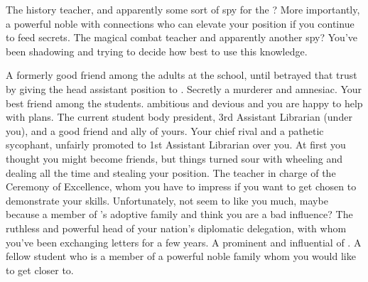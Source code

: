 \documentclass[char]{GL2020}
\begin{document}
\begin{contacts}
    \contact{\cHistory{}} The history teacher, and apparently some sort of spy for the \pFarm{}? More importantly, a powerful noble with connections who can elevate your position if you continue to feed \cHistory{\them} secrets.
    \contact{\cInterpol{}} The magical combat teacher and apparently another spy? You've been shadowing \cInterpol{} and trying to decide how best to use this knowledge. 
\end{contacts}

\begin{contacts}
    \contact{\cLibrarian{}} A formerly good friend among the adults at the school, until \cLibrarian{\they} betrayed that trust by giving the head assistant position to \cAmbition{}. Secretly a murderer and amnesiac.
    \contact{\cAdopted{}} Your best friend among the students. \cAdopted{\Theyare} ambitious and devious and you are happy to help \cAdopted{\them} with \cAdopted{\their} plans.
    \contact{\cPresident{}} The current student body president, 3rd Assistant Librarian (under you), and a good friend and ally of yours.
    \contact{\cAmbition{}} Your chief rival and a pathetic sycophant, unfairly promoted to 1st Assistant Librarian over you. At first you thought you might become friends, but things turned sour with \cAmbition{} wheeling and dealing all the time and stealing your position.
    \contact{\cMusic{}} The teacher in charge of the Ceremony of Excellence, whom you have to impress if you want to get chosen to demonstrate your skills. Unfortunately, \cMusic{\theydo} not seem to like you much, maybe because \cMusic{\theyare} a member of \cAdopted{}’s adoptive family and think\cMusic{\verbs} you are a bad influence?
    \contact{\cEvil{}} The ruthless and powerful head of your nation’s diplomatic delegation, with whom you’ve been exchanging letters for a few years.
    \contact{\cHedonist{}} A prominent and influential \cHedonist{\cleric} of \cFarmGod{}.
    \contact{\cChupStudent{}} A fellow student who is a member of a powerful noble family whom you would like to get closer to.
\end{contacts}
\end{document}

